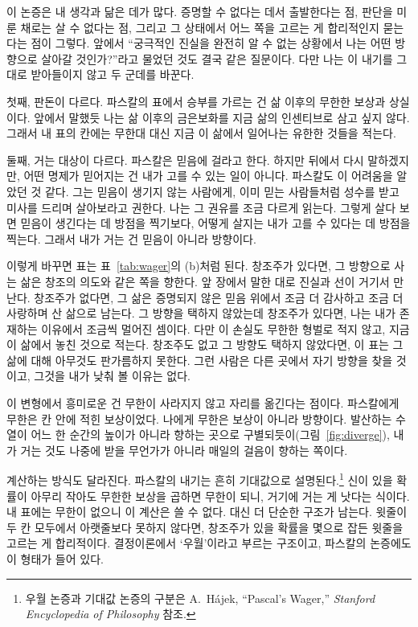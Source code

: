 \documentclass[11pt]{article}
\begin{document}
이 논증은 내 생각과 닮은 데가 많다. 증명할 수 없다는 데서 출발한다는 점, 판단을
미룬 채로는 살 수 없다는 점, 그리고 그 상태에서 어느 쪽을 고르는 게 합리적인지
묻는다는 점이 그렇다. 앞에서 “궁극적인 진실을 완전히 알 수 없는 상황에서 나는
어떤 방향으로 살아갈 것인가?”라고 물었던 것도 결국 같은 질문이다. 다만 나는 이
내기를 그대로 받아들이지 않고 두 군데를 바꾼다.

첫째, 판돈이 다르다. 파스칼의 표에서 승부를 가르는 건 삶 이후의 무한한 보상과
상실이다. 앞에서 말했듯 나는 삶 이후의 금은보화를 지금 삶의 인센티브로 삼고 싶지
않다. 그래서 내 표의 칸에는 무한대 대신 지금 이 삶에서 일어나는 유한한 것들을
적는다.

둘째, 거는 대상이 다르다. 파스칼은 믿음에 걸라고 한다. 하지만 뒤에서 다시
말하겠지만, 어떤 명제가 믿어지는 건 내가 고를 수 있는 일이 아니다. 파스칼도 이
어려움을 알았던 것 같다. 그는 믿음이 생기지 않는 사람에게, 이미 믿는 사람들처럼
성수를 받고 미사를 드리며 살아보라고 권한다. 나는 그 권유를 조금 다르게 읽는다.
그렇게 살다 보면 믿음이 생긴다는 데 방점을 찍기보다, 어떻게 살지는 내가 고를 수
있다는 데 방점을 찍는다. 그래서 내가 거는 건 믿음이 아니라 방향이다.

이렇게 바꾸면 표는 표~\ref{tab:wager}의 (b)처럼 된다. 창조주가 있다면, 그 방향으로 사는 삶은 창조의
의도와 같은 쪽을 향한다. 앞 장에서 말한 대로 진실과 선이 거기서 만난다. 창조주가
없다면, 그 삶은 증명되지 않은 믿음 위에서 조금 더 감사하고 조금 더 사랑하며 산
삶으로 남는다. 그 방향을 택하지 않았는데 창조주가 있다면, 나는 내가 존재하는
이유에서 조금씩 멀어진 셈이다. 다만 이 손실도 무한한 형벌로 적지 않고, 지금 이
삶에서 놓친 것으로 적는다. 창조주도 없고 그 방향도 택하지 않았다면, 이 표는 그
삶에 대해 아무것도 판가름하지 못한다. 그런 사람은 다른 곳에서 자기 방향을 찾을
것이고, 그것을 내가 낮춰 볼 이유는 없다.

이 변형에서 흥미로운 건 무한이 사라지지 않고 자리를 옮긴다는 점이다. 파스칼에게
무한은 칸 안에 적힌 보상이었다. 나에게 무한은 보상이 아니라 방향이다. 발산하는
수열이 어느 한 순간의 높이가 아니라 향하는 곳으로 구별되듯이(그림~\ref{fig:diverge}),
내가 거는 것도 나중에 받을 무언가가 아니라 매일의 걸음이 향하는 쪽이다.

계산하는 방식도 달라진다. 파스칼의 내기는 흔히 기대값으로 설명된다.\footnote{우월
논증과 기대값 논증의 구분은 A.~Hájek, “Pascal's Wager,” \emph{Stanford
Encyclopedia of Philosophy} 참조.} 신이 있을
확률이 아무리 작아도 무한한 보상을 곱하면 무한이 되니, 거기에 거는 게 낫다는
식이다. 내 표에는 무한이 없으니 이 계산은 쓸 수 없다. 대신 더 단순한 구조가
남는다. 윗줄이 두 칸 모두에서 아랫줄보다 못하지 않다면, 창조주가 있을 확률을 몇으로
잡든 윗줄을 고르는 게 합리적이다. 결정이론에서 ‘우월’이라고 부르는 구조이고,
파스칼의 논증에도 이 형태가 들어 있다.
\end{document}
